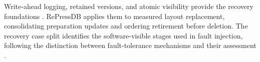 Write-ahead logging, retained versions, and atomic visibility provide the recovery foundations \citep{mohan1992aries,gray1992transaction,sqlitewal}. RePressDB applies them to measured layout replacement, consolidating preparation updates and ordering retirement before deletion. The recovery case split identifies the software-visible stages used in fault injection, following the distinction between fault-tolerance mechanisms and their assessment \citep{avizienis2004dependability}.

